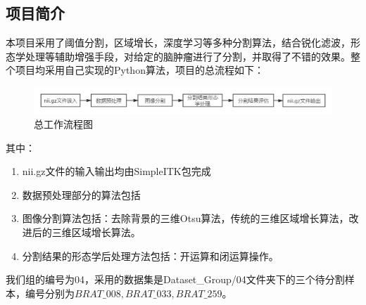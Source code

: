 \documentclass[UTF8]{ctexart}
\begin{document}
\subsection{项目简介}
本项目采用了阈值分割，区域增长，深度学习等多种分割算法，结合锐化滤波，形态学处理等辅助增强手段，对给定的脑肿瘤进行了分割，并取得了不错的效果。整个项目均采用自己实现的Python算法，项目的总流程如下：
\begin{figure}[H]
    \centering  %
    \includegraphics[width=\textwidth]{figure/workflow.png}
    \caption{总工作流程图}
\end{figure}
其中：
\begin{enumerate}[1)]
    \item nii.gz文件的输入输出均由SimpleITK包完成
    \item 数据预处理部分的算法包括 %
    \item 图像分割算法包括：去除背景的三维Otsu算法，传统的三维区域增长算法，改进后的三维区域增长算法。
    \item 分割结果的形态学后处理方法包括：开运算和闭运算操作。
\end{enumerate}

我们组的编号为04，采用的数据集是Dataset\_Group/04文件夹下的三个待分割样本，编号分别为$BRAT\_008,BRAT\_033,BRAT\_259$。
\end{document}
